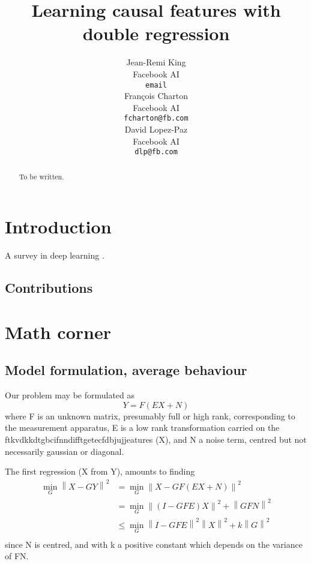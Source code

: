 \documentclass{article}
\title{Learning causal features with double regression}
\author{%
  Jean-Remi King\\
  Facebook AI\\
  \texttt{email} \\
  \And
  Fran\c{c}ois Charton\\
  Facebook AI\\
  \texttt{fcharton@fb.com}\\
  \And
  David Lopez-Paz\\
  Facebook AI\\
  \texttt{dlp@fb.com}
}
\begin{document}
\maketitle

\begin{abstract}
    To be written.
\end{abstract}

\section{Introduction}


A survey in deep learning \citep{deep_learning_nature}. 

\subsection{Contributions}

\section{Math corner}

\subsection{Model formulation, average behaviour}

Our problem may be formulated as
\begin{equation}
    Y = F(EX + N)
    \label{eq:model}
\end{equation}
where F is an unknown matrix, presumably full or high rank, corresponding to the measurement apparatus, E is a low rank transformation carried on the ftkvdkkdtgbcifnndifftgetecfdbjujjeatures (X), and N a noise term, centred but not necessarily gaussian or diagonal.

The first regression (X from Y), amounts to finding
\begin{equation}
\begin{aligned}
\min_G \left \| X-GY \right \|^2 &= \min_G \left \| X - GF(EX+N)\right\|^2 \\
&{}= \min_G \left \| (I-GFE)X\right\| ^2 + \left \| GFN\right \| ^2\\
&{}\leq \min_G \left \| I-GFE\right\| ^2 \left \| X\right\| ^2 + k\left \| G\right \| ^2\\ 
\end{aligned}
\end{equation}
since N is centred, and with k a positive constant which depends on the variance of FN.
\end{document}
